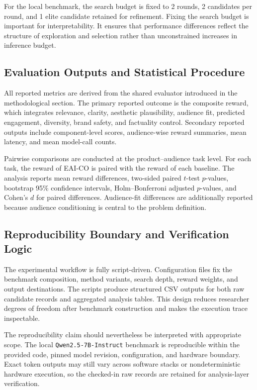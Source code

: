 \documentclass[applsci,article,submit,pdftex,moreauthors]{Definitions/mdpi}
\begin{document}
For the local benchmark, the search budget is fixed to 2 rounds, 2 candidates per round, and 1 elite candidate retained for refinement. Fixing the search budget is important for interpretability. It ensures that performance differences reflect the structure of exploration and selection rather than unconstrained increases in inference budget.

\subsection{Evaluation Outputs and Statistical Procedure}

All reported metrics are derived from the shared evaluator introduced in the methodological section. The primary reported outcome is the composite reward, which integrates relevance, clarity, aesthetic plausibility, audience fit, predicted engagement, diversity, brand safety, and factuality control. Secondary reported outputs include component-level scores, audience-wise reward summaries, mean latency, and mean model-call counts.

Pairwise comparisons are conducted at the product--audience task level. For each task, the reward of EAI-CO is paired with the reward of each baseline. The analysis reports mean reward differences, two-sided paired $t$-test $p$-values, bootstrap 95\% confidence intervals, Holm--Bonferroni adjusted $p$-values, and Cohen's $d$ for paired differences. Audience-fit differences are additionally reported because audience conditioning is central to the problem definition.

\subsection{Reproducibility Boundary and Verification Logic}

The experimental workflow is fully script-driven. Configuration files fix the benchmark composition, method variants, search depth, reward weights, and output destinations. The scripts produce structured CSV outputs for both raw candidate records and aggregated analysis tables. This design reduces researcher degrees of freedom after benchmark construction and makes the execution trace inspectable.

The reproducibility claim should nevertheless be interpreted with appropriate scope. The local \texttt{Qwen2.5-7B-Instruct} benchmark is reproducible within the provided code, pinned model revision, configuration, and hardware boundary. Exact token outputs may still vary across software stacks or nondeterministic hardware execution, so the checked-in raw records are retained for analysis-layer verification.
\end{document}
